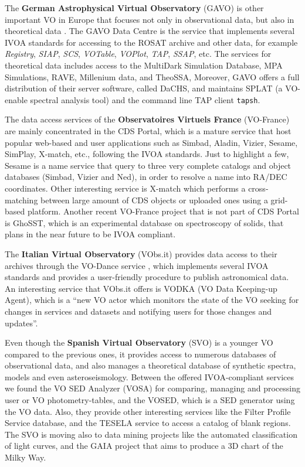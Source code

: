 The \textbf{German Astrophysical Virtual Observatory} (GAVO) is other important VO in Europe that focuses not
only in observational data, but also in theoretical data \cite{Lemson2007}.
The GAVO Data Centre is the service that implements several IVOA standards for 
accessing to the ROSAT archive and other data, for example 
\emph{Registry}, \emph{SIAP}, \emph{SCS}, \emph{VOTable}, \emph{VOPlot}, 
\emph{TAP}, \emph{SSAP}, etc. The services for 
theoretical data includes access to the MultiDark Simulation Database, %
MPA Simulations, %
RAVE, %
Millenium data, %
and TheoSSA, %
Moreover, GAVO offers a full distribution of their server software, called
DaCHS, and maintains SPLAT (a VO-enable spectral analysis tool) and the command line TAP
client \texttt{tapsh}.


The data access services of the \textbf{Observatoires Virtuels France}
(VO-France) are mainly concentrated in the 
CDS Portal, which is a mature service that host popular web-based and
user applications such as Simbad, Aladin, Vizier, Sesame, SimPlay, X-match,
etc., following the IVOA standards. 
Just to highlight a few, Sesame is a name service that query to 
three very complete catalogs and object databases (Simbad, Vizier and Ned),
in order to resolve a name into RA/DEC coordinates. Other interesting 
service is X-match which performs a cross-matching between large amount
of CDS objects or uploaded ones using a grid-based platform.
Another recent VO-France project that is not part of CDS Portal 
is GhoSST, %
which is an experimental database on spectroscopy of solids, that
plans in the near future to be IVOA compliant.

The \textbf{Italian Virtual Observatory} (VObs.it) provides data access to
their archives through the VO-Dance service \cite{Smareglia2001},
which implements several IVOA standards and provides a user-friendly procedure 
to publish astronomical data. An interesting service that VObs.it offers is
VODKA (VO Data Keeping-up Agent), which is a ``new VO actor which monitors the
state of the VO seeking for changes in services and datasets and notifying users
for those changes and updates''. \cite{Laurino2011}

Even though the \textbf{Spanish Virtual Observatory} (SVO) is a younger VO
compared to the previous ones, it
provides access to numerous databases of observational data, and also manages a
theoretical database of synthetic spectra, models and even asteroseismology.
Between the offered IVOA-compliant services we found the VO SED Analyzer (VOSA)
for comparing, managing and processing user or VO photometry-tables,
and the VOSED, which is a SED generator using the VO data.
Also, they provide other interesting services like the Filter Profile Service
database, and the TESELA service \cite{Cardiel2011} to access a catalog 
of blank regions.
The SVO is moving also to data mining projects like the automated classification
of light curves, and the GAIA project that aims to produce a 3D chart of the 
Milky Way. 

